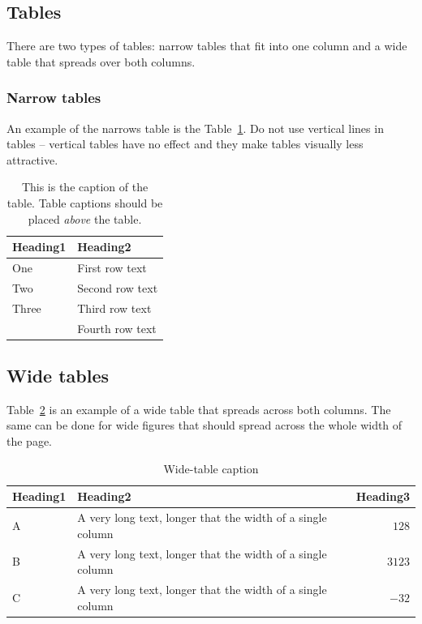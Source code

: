 \documentclass[10pt, a4paper]{article}
\begin{document}
\subsection{Tables}

There are two types of tables: narrow tables that fit into one column and a wide table that spreads over both columns.

\subsubsection{Narrow tables}

An example of the narrows table is the Table~\ref{tab:narrow-table}. Do not use vertical lines in tables -- vertical tables have no effect and they make tables visually less attractive.

\begin{table}
\caption{This is the caption of the table. Table captions should be placed \textit{above} the table.}
\label{tab:narrow-table}
\begin{center}
\begin{tabular}{ll}
\toprule
Heading1 & Heading2 \\
\midrule
One & First row text \\
Two   & Second row text \\
Three   & Third row text \\
      & Fourth row text \\
\bottomrule
\end{tabular}
\end{center}
\end{table}

\subsection{Wide tables}

Table~\ref{tab:wide-table} is an example of a wide table that spreads across both columns. The same can be done for wide figures that should spread across the whole width of the page. 

\begin{table}
\caption{Wide-table caption}
\label{tab:wide-table}
\begin{center}
\begin{tabular}{llr}
\toprule
Heading1 & Heading2 & Heading3\\
\midrule
A & A very long text, longer that the width of a single column & $128$\\
B & A very long text, longer that the width of a single column & $3123$\\
C & A very long text, longer that the width of a single column & $-32$\\
\bottomrule
\end{tabular}
\end{center}
\end{table}
\end{document}
